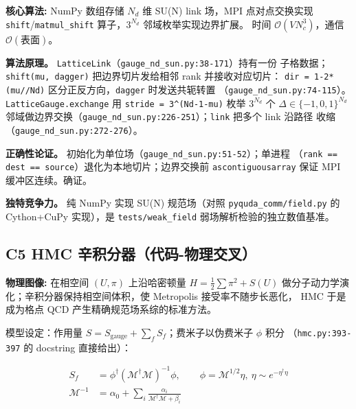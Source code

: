 \documentclass[UTF8]{ctexart}
\begin{document}
\begin{algobox}
\textbf{核心算法:} NumPy 数组存储 $N_d$ 维 SU(N) link 场，MPI 点对点交换实现
\texttt{shift}/\texttt{matmul\_shift} 算子，$3^{N_d}$ 邻域枚举实现边界扩展。
时间 $\mathcal{O}(V N_c^3)$，通信 $\mathcal{O}(\text{表面})$。
\end{algobox}

\textbf{算法原理。} \texttt{LatticeLink}（\texttt{gauge\_nd\_sun.py:38-171}）持有一份
子格数据；\texttt{shift(mu, dagger)} 把边界切片发给相邻 rank 并接收对应切片：
\texttt{dir = 1-2*(mu//Nd)} 区分正反方向，\texttt{dagger} 时发送共轭转置
（\texttt{gauge\_nd\_sun.py:74-115}）。\texttt{LatticeGauge.exchange} 用
\texttt{stride = 3\textasciicircum(Nd-1-mu)} 枚举 $3^{N_d}$ 个 $\Delta\in\{-1,0,1\}^{N_d}$
邻域做边界交换（\texttt{gauge\_nd\_sun.py:226-251}）；\texttt{link} 把多个 link 沿路径
收缩（\texttt{gauge\_nd\_sun.py:272-276}）。

\textbf{正确性论证。} 初始化为单位场（\texttt{gauge\_nd\_sun.py:51-52}）；单进程
（\texttt{rank == dest == source}）退化为本地切片；边界交换前 \texttt{ascontiguousarray}
保证 MPI 缓冲区连续。\textcolor{accent}{确证}。

\textbf{独特竞争力。} 纯 NumPy 实现 SU(N) 规范场（对照 \texttt{pyquda\_comm/field.py}
的 Cython+CuPy 实现），是 \texttt{tests/weak\_field} 弱场解析检验的独立数值基准。

\subsection{C5 HMC 辛积分器（代码-物理交叉）}

\begin{physbox}
\textbf{物理图像:} 在相空间 $(U,\pi)$ 上沿哈密顿量 $H = \tfrac12\sum\pi^2 + S(U)$
做分子动力学演化；辛积分器保持相空间体积，使 Metropolis 接受率不随步长恶化，
HMC 于是成为格点 QCD 产生精确规范场系综的标准方法。
\end{physbox}

模型设定：作用量 $S = S_{\mathrm{gauge}} + \sum_f S_f$；费米子以伪费米子 $\phi$ 积分
（\texttt{hmc.py:393-397} 的 docstring 直接给出）：

\begin{align}
S_f &= \phi^\dagger \left(\mathcal{M}^\dagger \mathcal{M}\right)^{-1} \phi,
\qquad \phi = \mathcal{M}^{1/2}\eta,\ \eta \sim e^{-\eta^\dagger\eta} \label{eq:pseudo}\\
\mathcal{M}^{-1} &= \alpha_0 + \sum_i \frac{\alpha_i}{\mathcal{M}^\dagger\mathcal{M} + \beta_i}
\label{eq:rational}
\end{align}
\end{document}

